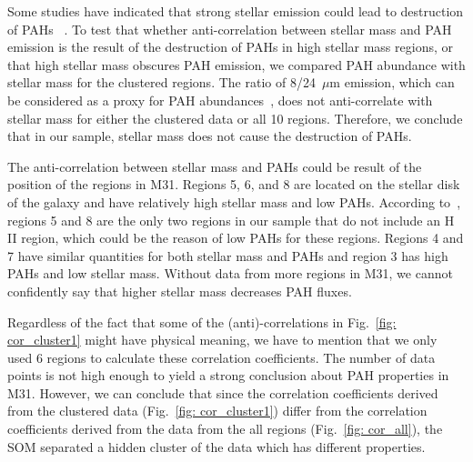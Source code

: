         Some studies have indicated that strong stellar emission could lead to destruction of PAHs ~\citep[e.g.][]{Clayton03,Seok14}.
        To test that whether anti-correlation between stellar mass and PAH emission is the result of the destruction of PAHs in high stellar mass regions, or that high stellar mass obscures PAH emission, we compared PAH abundance with stellar mass for the clustered regions.
        The ratio of 8/24~$\mu$m emission, which can be considered as a proxy for PAH abundances~\citep[e.g.][]{Sandstrom10,Khramtsova13}, does not anti-correlate with stellar mass for either the clustered data or all 10 regions.
        Therefore, we conclude that in our sample,  stellar mass does not cause the destruction of PAHs.
        
        The anti-correlation between stellar mass and PAHs could be result of the position of the regions in M31.
        Regions 5, 6, and 8 are located on the stellar disk of the galaxy and have relatively high stellar mass and low PAHs. 
        According to~\cite{Dim15}, regions 5 and 8 are the only two regions in our sample that do not include an H {\sc II} region, which could be the reason of low PAHs for these regions.
        Regions 4 and 7 have similar quantities for both stellar mass and PAHs and region 3 has high PAHs and low stellar mass.
        Without data from more regions in M31, we cannot confidently say that higher stellar mass decreases PAH fluxes.
        
        
        
       Regardless of the fact that some of the (anti)-correlations in Fig.~\ref{fig: cor_cluster1} might have physical meaning, we have to mention that we only used 6 regions to calculate these correlation coefficients.
       The number of data points is not high enough to yield a strong conclusion about PAH properties in M31.
        However, we can conclude that since the correlation coefficients derived from the clustered data (Fig.~\ref{fig: cor_cluster1}) differ from the correlation coefficients derived from the data from the all regions (Fig.~\ref{fig: cor_all}), the SOM separated a hidden cluster of the data which has different properties.
        
        
        
        
